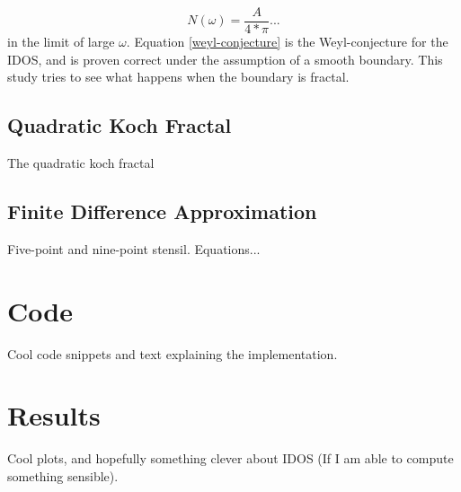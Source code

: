 \documentclass{article}
\begin{document}
\begin{equation}
    \label{weyl-conjecture}
    N(\omega) = \frac{A}{4*\pi}...
\end{equation}
in the limit of large $\omega$. Equation \ref{weyl-conjecture} is the Weyl-conjecture for the IDOS, and is proven correct under the assumption of a smooth boundary. This study tries to see what happens when the boundary is fractal.

\subsection{Quadratic Koch Fractal}
The quadratic koch fractal 

\subsection{Finite Difference Approximation}
Five-point and nine-point stensil. Equations...

\section{Code}
Cool code snippets and text explaining the implementation.

\section{Results}
Cool plots, and hopefully something clever about IDOS (If I am able to compute something sensible).
\end{document}
